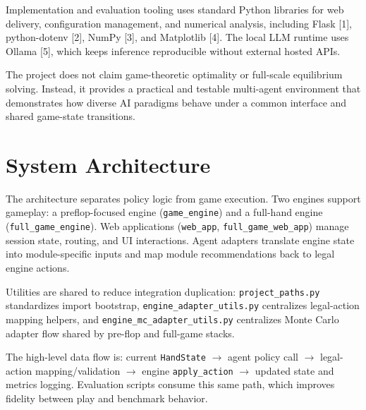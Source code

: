 \documentclass[11pt]{article}
\begin{document}
Implementation and evaluation tooling uses standard Python libraries for web delivery, configuration management, and numerical analysis, including Flask [1], python-dotenv [2], NumPy [3], and Matplotlib [4]. The local LLM runtime uses Ollama [5], which keeps inference reproducible without external hosted APIs.

The project does not claim game-theoretic optimality or full-scale equilibrium solving. Instead, it provides a practical and testable multi-agent environment that demonstrates how diverse AI paradigms behave under a common interface and shared game-state transitions.

\section{System Architecture}
The architecture separates policy logic from game execution. Two engines support gameplay: a preflop-focused engine (\texttt{game\_engine}) and a full-hand engine (\texttt{full\_game\_engine}). Web applications (\texttt{web\_app}, \texttt{full\_game\_web\_app}) manage session state, routing, and UI interactions. Agent adapters translate engine state into module-specific inputs and map module recommendations back to legal engine actions.

Utilities are shared to reduce integration duplication: \texttt{project\_paths.py} standardizes import bootstrap, \texttt{engine\_adapter\_utils.py} centralizes legal-action mapping helpers, and \texttt{engine\_mc\_adapter\_utils.py} centralizes Monte Carlo adapter flow shared by pre-flop and full-game stacks.

The high-level data flow is: current \texttt{HandState} $\rightarrow$ agent policy call $\rightarrow$ legal-action mapping/validation $\rightarrow$ engine \texttt{apply\_action} $\rightarrow$ updated state and metrics logging. Evaluation scripts consume this same path, which improves fidelity between play and benchmark behavior.
\end{document}
